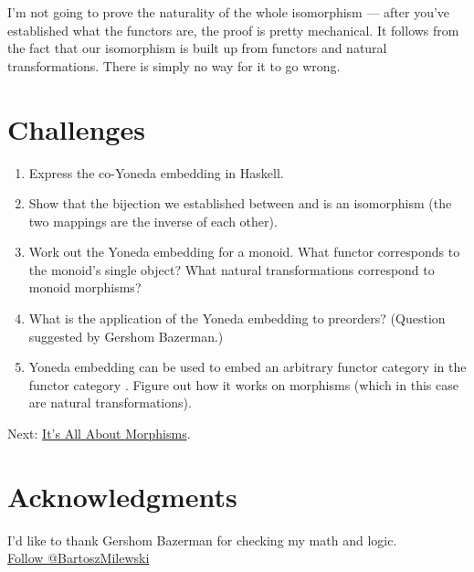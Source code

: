 I'm not going to prove the naturality of the whole isomorphism --- after
you've established what the functors are, the proof is pretty
mechanical. It follows from the fact that our isomorphism is built up
from functors and natural transformations. There is simply no way for it
to go wrong.

\section{Challenges}\label{challenges}

\begin{enumerate}
\tightlist
\item
  Express the co-Yoneda embedding in Haskell.
\item
  Show that the bijection we established between  and
   is an isomorphism (the two mappings are the inverse of
  each other).
\item
  Work out the Yoneda embedding for a monoid. What functor corresponds
  to the monoid's single object? What natural transformations correspond
  to monoid morphisms?
\item
  What is the application of the  Yoneda embedding to
  preorders? (Question suggested by Gershom Bazerman.)
\item
  Yoneda embedding can be used to embed an arbitrary functor category
  \code{{[}C,\ D{]}} in the functor category
  \code{{[}{[}C,\ D{]},\ Set{]}}. Figure out how it works on morphisms
  (which in this case are natural transformations).
\end{enumerate}

Next:
\href{https://bartoszmilewski.com/2015/11/17/its-all-about-morphisms/}{It's
All About Morphisms}.

\section{Acknowledgments}\label{acknowledgments}

I'd like to thank Gershom Bazerman for checking my math and logic.\\
\href{https://twitter.com/BartoszMilewski}{Follow @BartoszMilewski}
